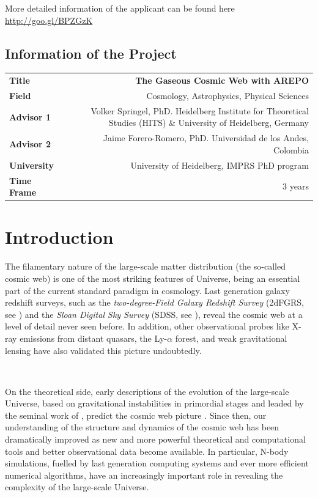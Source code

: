 \documentclass[a4,useAMS,usenatbib,usegraphicx,12pt]{article}
\begin{document}
\vspace{10pt}

More detailed information of the applicant can be found here \url{http://goo.gl/BPZGzK}

\vspace{15pt}  

\subsection*{Information of the Project}
\begin{tabular}{L!{\VRule}R}
\bf Title		& \bf The Gaseous Cosmic Web with AREPO\\
\bf Field		& Cosmology, Astrophysics, Physical Sciences \\
\bf Advisor 1	& Volker Springel, PhD. Heidelberg Institute for Theoretical Studies (HITS) \& University of Heidelberg, Germany \\
\bf Advisor 2	& Jaime Forero-Romero, PhD. Universidad de los Andes, Colombia \\
\bf University	& University of Heidelberg, IMPRS PhD program \\
\bf Time Frame	& 3 years \\
\end{tabular}
\normalsize

\newpage

\section{Introduction}


The filamentary nature of the large-scale matter distribution (the so-called 
cosmic web) is one of the most striking features of Universe, being an 
essential part of the current standard paradigm in cosmology. Last generation 
galaxy redshift surveys, such as the \textit{two-degree-Field Galaxy Redshift 
Survey} (2dFGRS, see \citet{Colless03}) and the \textit{Sloan Digital Sky 
Survey} (SDSS, see \citet{Abazajian09}), reveal the cosmic web at a level of 
detail never seen before. In addition, other observational probes like X-ray 
emissions from distant quasars, the Ly-$\alpha$ forest, and weak gravitational 
lensing have also validated this picture undoubtedly.

\

On the theoretical side, early descriptions of the evolution of the large-scale
Universe, based on gravitational instabilities in primordial stages and leaded 
by the seminal work of \citet{Zeldovich70}, predict the cosmic web picture 
\citep{Bond96}. Since then, our understanding of the structure and dynamics of 
the cosmic web has been dramatically improved as new and more powerful 
theoretical and computational tools and better observational data become 
available. In particular, N-body simulations, fuelled by last generation 
computing systems and ever more efficient numerical algorithms, have an 
increasingly important role in revealing the complexity of the large-scale 
Universe.
\end{document}
